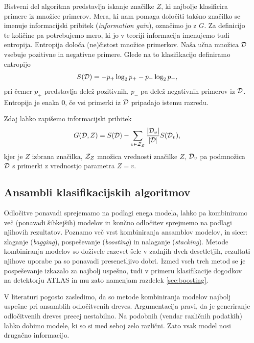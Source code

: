 \documentclass[11pt,a4paper,openany]{book}
\begin{document}
Bistveni del algoritma predstavlja iskanje značilke $Z$, ki najbolje klasificira primere iz množice primerov. Mera, ki nam pomaga določiti takšno značilko se imenuje informacijski pribitek (\textit{information gain}), označimo jo z $G$. Za definicijo te količine pa potrebujemo mero, ki jo v teoriji informacija imenujemo tudi entropija. Entropija določa (ne)čistost množice primerkov. Naša učna množica ${\cal D}$ vsebuje pozitivne in negativne primere. Glede na to klasifikacijo definiramo entropijo
\begin{eqnarray}
	S({\cal D}) = -p_+\log_2 p_+ - p_- \log_2 p_-,
	\label{eq:entropy}
\end{eqnarray}
pri čemer $p_+$ predstavlja delež pozitivnih, $p_-$ pa delež negativnih primerov iz ${\cal D}$. Entropija je enaka $0$, če vsi primerki iz ${\cal D}$ pripadajo istemu razredu.

Zdaj lahko zapišemo informacijski pribitek
\begin{eqnarray}
	G({\cal D}, Z) = S({\cal D}) - \sum_{v \in {\cal Z}_Z} \frac{|{\cal D}_v|}{|{\cal D}|}S({\cal D}_v),
\end{eqnarray}
kjer je $Z$ izbrana značilka, ${\cal Z}_Z$ množica vrednosti značilke $Z$, ${\cal D}_v$ pa podmnožica ${\cal D}$ s primerki z vrednostjo parametra $Z = v$.



\subsection{Ansambli klasifikacijskih algoritmov}

Odločitve ponavadi sprejemamo na podlagi enega modela, lahko pa kombiniramo več (ponavadi šibkejših) modelov in končno odločitev sprejmemo na podlagi njihovih rezultatov. Poznamo več vrst kombiniranja ansamblov modelov, in sicer: zlaganje (\textit{bagging}), pospeševanje (\textit{boosting}) in nalaganje (\textit{stacking}). \cite{Witten2005} Metode kombiniranja modelov so doživele razcvet šele v zadnjih dveh desetletjih, rezultati njihove uporabe pa so ponavadi presenetljivo dobri. Izmed vseh treh metod se je pospeševanje izkazalo za najbolj uspešno, tudi v primeru klasifikacije dogodkov na detektorju ATLAS in mu zato namenjam razdelek \ref{sec:boosting}.

V literaturi pogosto zasledimo, da so metode kombiniranja modelov najbolj uspešne pri ansamblih odločitvenih dreves. Argumentacija pravi, da je generiranje odločitvenih dreves precej nestabilno. Na podobnih (vendar različnih podatkih) lahko dobimo modele, ki so si med seboj zelo različni. Zato vsak model nosi drugačno informacijo.
\end{document}
